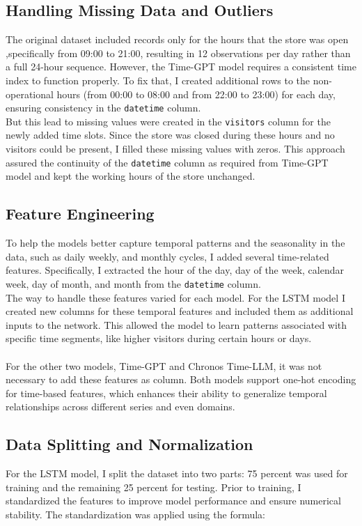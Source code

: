 \documentclass{article}
\begin{document}
\subsection{Handling Missing Data and Outliers}
The original dataset included records only for the hours that the store was open ,specifically from 09:00 to 21:00, resulting in 12 observations per day rather than a full 24-hour sequence. However, the Time-GPT model requires a consistent time index to function properly. To fix that, I created additional rows to the non-operational hours (from 00:00 to 08:00 and from 22:00 to 23:00) for each day, ensuring consistency in the \texttt{datetime} column.\\
But this lead to missing values were created in the \texttt{visitors} column for the newly added time slots. Since the store was closed during these hours and no visitors could be present, I filled these missing values with zeros. This approach assured the continuity of the \texttt{datetime} column as required from Time-GPT model and kept the working hours of the store unchanged.

\subsection{Feature Engineering}
To help the models better capture temporal patterns and the seasonality in the data, such as daily weekly, and monthly cycles, I added several time-related features. Specifically, I extracted the hour of the day, day of the week, calendar week, day of month, and month from the \texttt{datetime} column.
\\
The way to handle these features varied for each model. For the LSTM model I created
new columns for these temporal features and included them as additional inputs to the network. This allowed the model to learn patterns associated with specific time segments, like higher visitors during certain hours or days.\\
\\
For the other two models, Time-GPT and Chronos Time-LLM, it was not necessary to add these features as column. Both models support one-hot encoding for time-based features, which enhances their ability to generalize temporal relationships across different series and even domains.

\subsection{Data Splitting and Normalization}
For the LSTM model, I split the dataset into two parts: 75 percent was used for training and the remaining 25 percent for testing. Prior to training, I standardized the features to improve model performance and ensure numerical stability. The standardization was applied using the formula:
\end{document}
